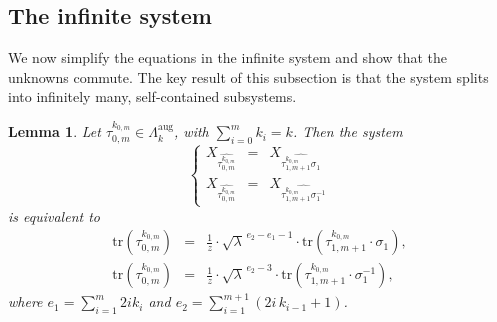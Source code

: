 \documentclass[11pt]{amsart}
\newtheorem{lemma}{Lemma}
\begin{document}
\subsection{The infinite system}\label{sys}

We now simplify the equations in the infinite system and show that the unknowns commute. The key result of this subsection is that the system splits into infinitely many, self-contained subsystems.

\begin{lemma}
Let \(\tau_{0,m}^{k_{0,m}} \in \Lambda^{\text{aug}}_k\), with \(\sum_{i=0}^{m}k_i=k\). Then the system
\[
\left\{
\begin{array}{lll}
X_{\widehat{\tau_{0,m}^{k_{0,m}}}} & = & X_{\widehat{\tau_{1,m+1}^{k_{0,m}}\sigma_1}} \\[6pt]
X_{\widehat{\tau_{0,m}^{k_{0,m}}}} & = & X_{\widehat{\tau_{1,m+1}^{k_{0,m}}\sigma_1^{-1}}}
\end{array}
\right.
\]
is equivalent to
\[
\begin{array}{lll}
\mathrm{tr}(\tau_{0,m}^{k_{0,m}}) & = & \displaystyle\frac{1}{z}\cdot \sqrt{\lambda}^{\,e_2-e_1-1}\cdot \mathrm{tr}(\tau_{1,m+1}^{k_{0,m}}\cdot \sigma_1), \\[6pt]
\mathrm{tr}(\tau_{0,m}^{k_{0,m}}) & = & \displaystyle\frac{1}{z}\cdot \sqrt{\lambda}^{\,e_2-3}\cdot \mathrm{tr}(\tau_{1,m+1}^{k_{0,m}}\cdot \sigma_1^{-1}),
\end{array}
\]
where \(e_1=\sum_{i=1}^{m}2i k_i\) and \(e_2=\sum_{i=1}^{m+1}(2i\,k_{i-1}+1)\).
\end{lemma}
\end{document}
